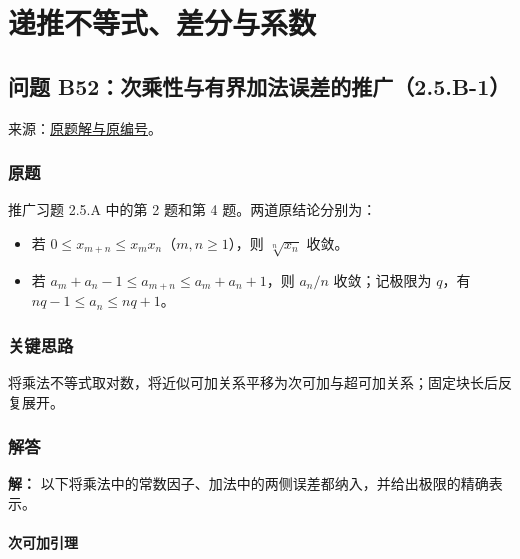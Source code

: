 \documentclass[11pt,a4paper]{article}
\providecommand{\tightlist}{\setlength{\itemsep}{3pt}\setlength{\parskip}{0pt}}
\begin{document}
\section{递推不等式、差分与系数}\label{ux9012ux63a8ux4e0dux7b49ux5f0fux5deeux5206ux4e0eux7cfbux6570}

\subsection{问题
B52：次乘性与有界加法误差的推广（2.5.B-1）}\label{ux95eeux9898-b52ux6b21ux4e58ux6027ux4e0eux6709ux754cux52a0ux6cd5ux8befux5deeux7684ux63a8ux5e7f2.5.b-1}

来源：\href{https://zj139.github.io/math-notes/problems/6e82c6e274a8f219f40720c7/\#问题-b52}{原题解与原编号}。

\subsubsection{原题}\label{ux539fux9898-22}

推广习题 2.5.A 中的第 2 题和第 4 题。两道原结论分别为：

\begin{itemize}
\tightlist
\item
  若 \(0\le x_{m+n}\le x_mx_n\)（\(m,n\ge1\)），则 \(\sqrt[n]{x_n}\)
  收敛。
\item
  若 \(a_m+a_n-1\le a_{m+n}\le a_m+a_n+1\)，则 \(a_n/n\) 收敛；记极限为
  \(q\)，有 \(nq-1\le a_n\le nq+1\)。
\end{itemize}

\subsubsection{关键思路}\label{ux5173ux952eux601dux8def-22}

将乘法不等式取对数，将近似可加关系平移为次可加与超可加关系；固定块长后反复展开。

\subsubsection{解答}\label{ux89e3ux7b54-22}

\textbf{解：}
以下将乘法中的常数因子、加法中的两侧误差都纳入，并给出极限的精确表示。

\paragraph{次可加引理}\label{ux6b21ux53efux52a0ux5f15ux7406}
\end{document}
